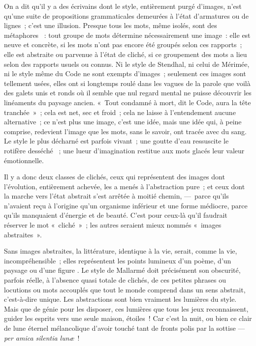 \documentclass[french,twoside]{book} %
\begin{document}
On a dit qu’il y a des écrivains dont le style, entièrement purgé d’images, n’est qu’une suite de propositions grammaticales demeurées à l’état d’armatures ou de lignes ; c’est une illusion. Presque tous les mots, même isolés, sont des métaphores  : tout groupe de mots détermine nécessairement une image : elle est neuve et concrète, si les mots n’ont pas encore été groupés selon ces rapports ; elle est abstraite ou parvenue à l’état de cliché, si ce groupement des mots a lieu selon des rapports usuels ou connus. Ni le style de Stendhal, ni celui de Mérimée, ni le style même du Code ne sont exempts d’images ; seulement ces images sont tellement usées, elles ont si longtemps roulé dans les vagues de la parole que voilà des galets unis et ronds où il semble que nul regard mental ne puisse découvrir les linéaments du paysage ancien. « Tout condamné à mort, dit le Code, aura la tête tranchée » ; cela est net, sec et froid ; cela ne laisse à l’entendement aucune alternative ; ce n’est plus une image, c’est une idée, mais une idée qui, à peine comprise, redevient l’image que les mots, sans le savoir, ont tracée avec du sang. Le style le plus décharné est parfois vivant ; une goutte d’eau ressuscite le rotifère desséché  ; une lueur d’imagination restitue aux mots glacés leur valeur émotionnelle.\par
Il y a donc deux classes de clichés, ceux qui représentent des images dont l’évolution, entièrement achevée, les a menés à l’abstraction pure ; et ceux dont la marche vers l’état abstrait s’est arrêtée à moitié chemin, — parce qu’ils n’avaient reçu à l’origine qu’un organisme inférieur et une forme médiocre, parce qu’ils manquaient d’énergie et de beauté. C’est pour ceux-là qu’il faudrait réserver le mot « cliché » ; les autres seraient mieux nommés « images abstraites ».\par
Sans images abstraites, la littérature, identique à la vie, serait, comme la vie, incompréhensible ; elles représentent les points lumineux d’un poème, d’un paysage ou d’une figure . Le style de Mallarmé doit précisément son obscurité, parfois réelle, à l’absence quasi totale de clichés, de ces petites phrases ou locutions ou mots accouplés que tout le monde comprend dans un sens abstrait, c’est-à-dire unique. Les abstractions sont bien vraiment les lumières du style. Mais que de génie pour les disposer, ces lumières que tous les jeux reconnaissent, guider les esprits vers une seule maison, étoiles ! Car c’est la nuit, ou bien ce clair de lune éternel mélancolique d’avoir touché tant de fronts polis par la sottise — {\itshape per amica silentia lunæ} !\par
\end{document}
